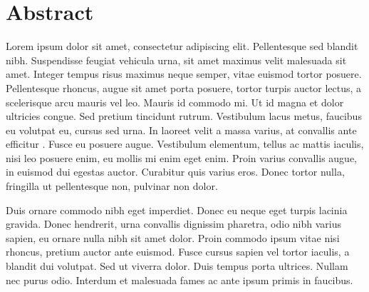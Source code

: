 \chapter*{Abstract}
 Lorem ipsum dolor sit amet, consectetur adipiscing elit. Pellentesque sed blandit nibh. Suspendisse feugiat vehicula urna, sit amet maximus velit malesuada sit amet. Integer tempus risus maximus neque semper, vitae euismod tortor posuere. Pellentesque rhoncus, augue sit amet porta posuere, tortor turpis auctor lectus, a scelerisque arcu mauris vel leo. Mauris id commodo mi. Ut id magna et dolor ultricies congue. Sed pretium tincidunt rutrum. Vestibulum lacus metus, faucibus eu volutpat eu, cursus sed urna. In laoreet velit a massa varius, at convallis ante efficitur \parencite{LevinsonDurbin}. Fusce eu posuere augue. Vestibulum elementum, tellus ac mattis iaculis, nisi leo posuere enim, eu mollis mi enim eget enim. Proin varius convallis augue, in euismod dui egestas auctor. Curabitur quis varius eros. Donec tortor nulla, fringilla ut pellentesque non, pulvinar non dolor.

Duis ornare commodo nibh eget imperdiet. Donec eu neque eget turpis lacinia gravida. Donec hendrerit, urna convallis dignissim pharetra, odio nibh varius sapien, eu ornare nulla nibh sit amet dolor. Proin commodo ipsum vitae nisi rhoncus, pretium auctor ante euismod. Fusce cursus sapien vel tortor iaculis, a blandit dui volutpat. Sed ut viverra dolor. Duis tempus porta ultrices. Nullam nec purus odio. Interdum et malesuada fames ac ante ipsum primis in faucibus.